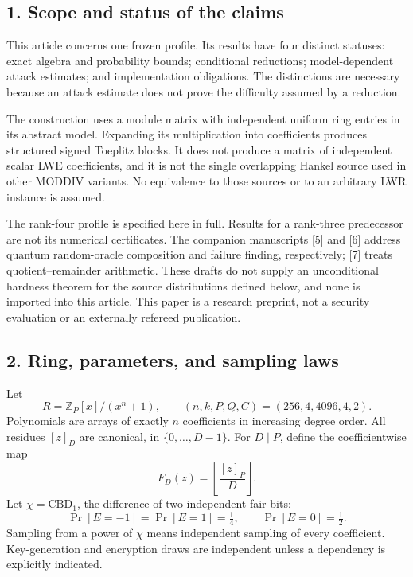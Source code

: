 \documentclass[
  10pt,
  a4paper,
]{article}
\begin{document}
\subsection{1. Scope and status of the
claims}\label{scope-and-status-of-the-claims}

This article concerns one frozen profile. Its results have four distinct
statuses: exact algebra and probability bounds; conditional reductions;
model-dependent attack estimates; and implementation obligations. The
distinctions are necessary because an attack estimate does not prove the
difficulty assumed by a reduction.

The construction uses a module matrix with independent uniform ring
entries in its abstract model. Expanding its multiplication into
coefficients produces structured signed Toeplitz blocks. It does not
produce a matrix of independent scalar LWE coefficients, and it is not
the single overlapping Hankel source used in other MODDIV variants. No
equivalence to those sources or to an arbitrary LWR instance is assumed.

The rank-four profile is specified here in full. Results for a
rank-three predecessor are not its numerical certificates. The companion
manuscripts {[}5{]} and {[}6{]} address quantum random-oracle
composition and failure finding, respectively; {[}7{]} treats
quotient--remainder arithmetic. These drafts do not supply an
unconditional hardness theorem for the source distributions defined
below, and none is imported into this article. This paper is a research
preprint, not a security evaluation or an externally refereed
publication.

\subsection{2. Ring, parameters, and sampling
laws}\label{ring-parameters-and-sampling-laws}

Let \[
R=\mathbb Z_P[x]/(x^n+1),\qquad
(n,k,P,Q,C)=(256,4,4096,4,2).
\] Polynomials are arrays of exactly \(n\) coefficients in increasing
degree order. All residues \([z]_D\) are canonical, in
\(\{0,\ldots,D-1\}\). For \(D\mid P\), define the coefficientwise map \[
F_D(z)=\left\lfloor\frac{[z]_P}{D}\right\rfloor.
\] Let \(\chi=\mathrm{CBD}_1\), the difference of two independent fair
bits: \[
\Pr[E=-1]=\Pr[E=1]=\tfrac14,\qquad \Pr[E=0]=\tfrac12.
\] Sampling from a power of \(\chi\) means independent sampling of every
coefficient. Key-generation and encryption draws are independent unless
a dependency is explicitly indicated.
\end{document}
